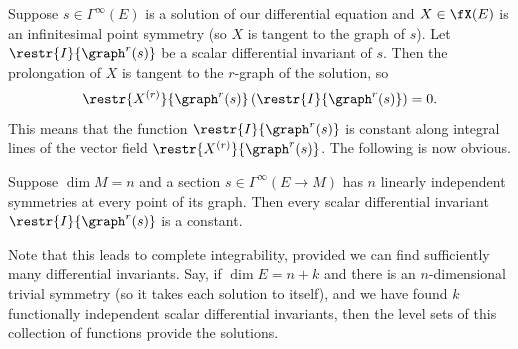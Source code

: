 Suppose $s\in\Gamma^\infty(E)$ is a solution of our differential equation and $X\in\fX(E)$ is an infinitesimal point symmetry (so $X$ is tangent to the graph of $s$). Let $\restr{I}{\graph^r(s)}$ be a scalar differential invariant of $s$. Then the prolongation of $X$ is tangent to the $r$-graph of the solution, so
\[\restr{X^{(r)}}{\graph^r(s)}\left(\restr{I}{\graph^r(s)}\right)=0.\]
This means that the function $\restr{I}{\graph^r(s)}$ is constant along integral lines of the vector field $\restr{X^{(r)}}{\graph^r(s)}$. The following is now obvious.

\begin{prop}
    Suppose $\dim M=n$ and a section $s\in\Gamma^\infty(E\to M)$ has $n$ linearly independent symmetries at every point of its graph. Then every scalar differential invariant $\restr{I}{\graph^r(s)}$ is a constant.
\end{prop}

Note that this leads to complete integrability, provided we can find sufficiently many differential invariants. Say, if $\dim E=n+k$ and there is an $n$-dimensional trivial symmetry (so it takes each solution to itself), and we have found $k$ functionally independent scalar differential invariants, then the level sets of this collection of functions provide the solutions.










